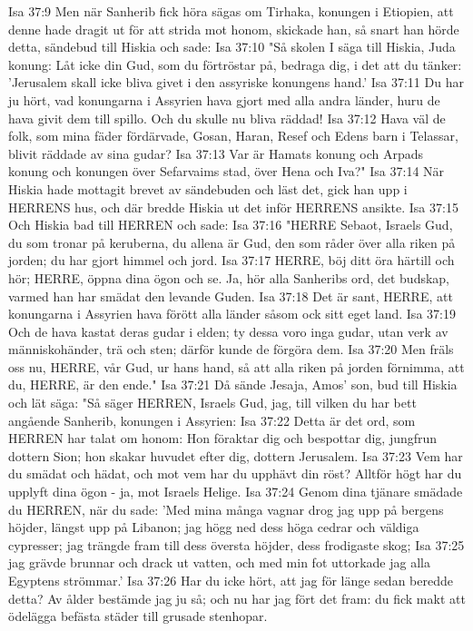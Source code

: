 Isa 37:9  Men när Sanherib fick höra sägas om Tirhaka, konungen i Etiopien, att denne hade dragit ut för att strida mot honom, skickade han, så snart han hörde detta, sändebud till Hiskia och sade:
Isa 37:10  "Så skolen I säga till Hiskia, Juda konung: Låt icke din Gud, som du förtröstar på, bedraga dig, i det att du tänker: 'Jerusalem skall icke bliva givet i den assyriske konungens hand.'
Isa 37:11  Du har ju hört, vad konungarna i Assyrien hava gjort med alla andra länder, huru de hava givit dem till spillo. Och du skulle nu bliva räddad!
Isa 37:12  Hava väl de folk, som mina fäder fördärvade, Gosan, Haran, Resef och Edens barn i Telassar, blivit räddade av sina gudar?
Isa 37:13  Var är Hamats konung och Arpads konung och konungen över Sefarvaims stad, över Hena och Iva?"
Isa 37:14  När Hiskia hade mottagit brevet av sändebuden och läst det, gick han upp i HERRENS hus, och där bredde Hiskia ut det inför HERRENS ansikte.
Isa 37:15  Och Hiskia bad till HERREN och sade:
Isa 37:16  "HERRE Sebaot, Israels Gud, du som tronar på keruberna, du allena är Gud, den som råder över alla riken på jorden; du har gjort himmel och jord.
Isa 37:17  HERRE, böj ditt öra härtill och hör; HERRE, öppna dina ögon och se. Ja, hör alla Sanheribs ord, det budskap, varmed han har smädat den levande Guden.
Isa 37:18  Det är sant, HERRE, att konungarna i Assyrien hava förött alla länder såsom ock sitt eget land.
Isa 37:19  Och de hava kastat deras gudar i elden; ty dessa voro inga gudar, utan verk av människohänder, trä och sten; därför kunde de förgöra dem.
Isa 37:20  Men fräls oss nu, HERRE, vår Gud, ur hans hand, så att alla riken på jorden förnimma, att du, HERRE, är den ende."
Isa 37:21  Då sände Jesaja, Amos' son, bud till Hiskia och lät säga: "Så säger HERREN, Israels Gud, jag, till vilken du har bett angående Sanherib, konungen i Assyrien:
Isa 37:22  Detta är det ord, som HERREN har talat om honom: Hon föraktar dig och bespottar dig, jungfrun dottern Sion; hon skakar huvudet efter dig, dottern Jerusalem.
Isa 37:23  Vem har du smädat och hädat, och mot vem har du upphävt din röst? Alltför högt har du upplyft dina ögon - ja, mot Israels Helige.
Isa 37:24  Genom dina tjänare smädade du HERREN, när du sade: 'Med mina många vagnar drog jag upp på bergens höjder, längst upp på Libanon; jag högg ned dess höga cedrar och väldiga cypresser; jag trängde fram till dess översta höjder, dess frodigaste skog;
Isa 37:25  jag grävde brunnar och drack ut vatten, och med min fot uttorkade jag alla Egyptens strömmar.'
Isa 37:26  Har du icke hört, att jag för länge sedan beredde detta? Av ålder bestämde jag ju så; och nu har jag fört det fram: du fick makt att ödelägga befästa städer till grusade stenhopar.
